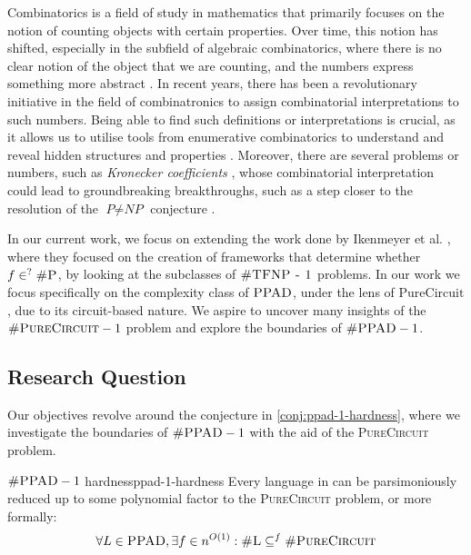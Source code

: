 Combinatorics is a field of study in mathematics that primarily focuses on
the notion of counting objects with certain properties. Over time, this notion
has shifted, especially in the subfield of algebraic combinatorics, where
there is no clear notion of the object that we are counting,
and the numbers express something more abstract \cite{pak_WhatCombinatorialInterpretation_2022}.
In recent years, there has been a revolutionary
initiative in the field of combinatronics to assign combinatorial interpretations to such numbers.
Being able to find such definitions or interpretations is crucial,
as it allows us to utilise tools from enumerative combinatorics to understand
and reveal hidden structures and properties \cite{pak_WhatCombinatorialInterpretation_2022}. 
Moreover, there are several problems or numbers, such as \textit{Kronecker coefficients} \cite{makar_AnalysisKroneckerProduct_1949},
whose combinatorial interpretation could lead to groundbreaking breakthroughs, such as a step closer to the resolution of the $\textit{P} \neq \textit{NP}$
conjecture \cite{ikenmeyer_WhatWhatNot_2022, ikenmeyer_VanishingKroneckerCoefficients_2017}.


In our current work, we focus on extending the work done by
Ikenmeyer et al. \cite{ikenmeyer_WhatWhatNot_2022}, where they focused on the creation of frameworks
that determine whether $f \in^? \textsc{\#P}$, by looking
at the subclasses of $\textsc{\#TFNP - 1}$ problems.
In our work we focus specifically on the complexity class of $\textsc{PPAD}$, under the lens of $\text{PureCircuit}$,
due to its circuit-based nature.
We aspire to uncover many insights of the $\textsc{\#PureCircuit} -1$ problem 
and explore the boundaries of $\textsc{\#PPAD} -1$.


\subsection{Research Question}

Our objectives revolve around the conjecture in \ref{conj:ppad-1-hardness}, where
we investigate the boundaries of $\textnormal{\textsc{\#PPAD}}-1$ with the aid of the \textsc{PureCircuit} problem.
\begin{conjecturebox}{$\textnormal{\textsc{\#PPAD}}-1$ hardness}{ppad-1-hardness}
    Every language in  can be parsimoniously reduced up to some polynomial factor to the
    \textsc{PureCircuit} problem, or more formally:
    $$
    \forall L \in \textnormal{\textsc{PPAD}}, \exists f \in n^{O(1)}: 
    \textnormal{\textsc{\#L}} \subseteq^f \textnormal{\textsc{\#PureCircuit}}
    $$
\end{conjecturebox}




